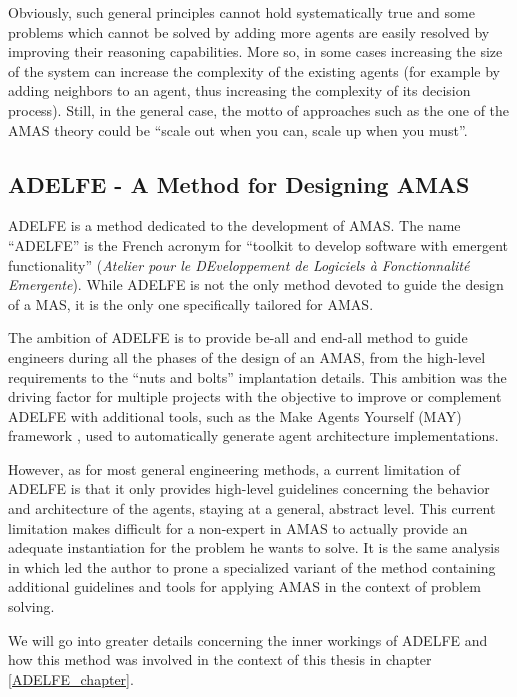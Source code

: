 Obviously, such general principles cannot hold systematically true and some problems which cannot be solved by adding more agents are easily resolved by improving their reasoning capabilities. More so, in some cases increasing the size of the system can increase the complexity of the existing agents (for example by adding neighbors to an agent, thus increasing the complexity of its decision process). Still, in the general case, the motto of approaches such as the one of the AMAS theory could be \enquote{scale out when you can, scale up when you must}. 

\subsection{ADELFE - A Method for Designing AMAS}\label{AMAS-ADELFE}

ADELFE \cite{bernon2003adelfe} is a method dedicated to the development of AMAS. The name \enquote{ADELFE} is the French acronym for \enquote{toolkit to develop software with emergent functionality} (\textit{Atelier pour le DEveloppement de Logiciels à Fonctionnalité Emergente}). While ADELFE is not the only method devoted to guide the design of a MAS, it is the only one specifically tailored for AMAS.

The ambition of ADELFE is to provide be-all and end-all method to guide engineers during all the phases of the design of an AMAS, from the high-level requirements to the \enquote{nuts and bolts} implantation details. This ambition was the driving factor for multiple projects with the objective to improve or complement ADELFE with additional tools, such as the Make Agents Yourself (MAY) framework \cite{No2012.2}, used to automatically generate agent architecture implementations.

However, as for most general engineering methods, a current limitation of ADELFE is that it only provides high-level guidelines concerning the behavior and architecture of the agents, staying at a general, abstract level. This current limitation makes difficult for a non-expert in AMAS to actually provide an adequate instantiation for the problem he wants to solve. It is the same analysis in \cite{Ka2011.6} which led the author to prone a specialized variant of the method containing additional guidelines and tools for applying AMAS in the context of problem solving.

We will go into greater details concerning the inner workings of ADELFE and how this method was involved in the context of this thesis in chapter \ref{ADELFE_chapter}.

